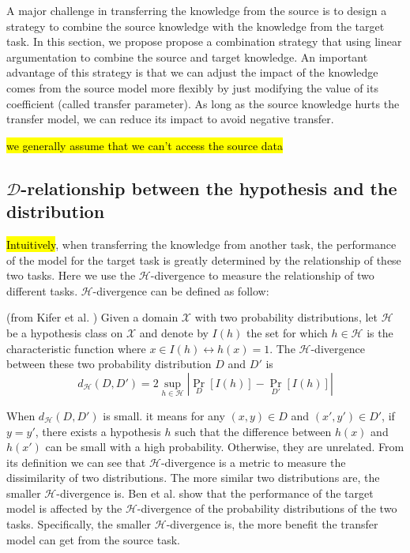 A major challenge in transferring the knowledge from the source is to design a strategy to combine the source knowledge with the knowledge from the target task. In this section, we propose propose a combination strategy that using linear argumentation to combine the source and target knowledge. An important advantage of this strategy is that we can adjust the impact of the knowledge comes from the source model more flexibly by just modifying the value of its coefficient (called transfer parameter). As long as the source knowledge hurts the transfer model, we can reduce its impact to avoid negative transfer.

\hl{we generally assume that we can't access the source data}

\subsection{$\mathcal{D}$-relationship between the hypothesis and the distribution}
\hl{Intuitively}, when transferring the knowledge from another task, the performance of the model for the target task is greatly determined by the relationship of these two tasks. Here we use the $\mathcal{H}$-divergence to measure the relationship of two different tasks. $\mathcal{H}$-divergence can be defined as follow:
\begin{defi} \label{single:hdivergence}
	(from Kifer et al. \cite{kifer2004detecting}) Given a domain $\mathcal{X}$ with two probability distributions, let $\mathcal{H}$ be a hypothesis class on $\mathcal{X}$ and denote by $I(h)$ the set for which $h \in \mathcal{H}$ is the characteristic function where $x\in I(h) \leftrightarrow h(x)=1$. The $\mathcal{H}$-divergence between these two probability distribution $D$ and $D'$ is 
	\begin{equation*}
	{d_{\mathcal{H}}}\left( {D,D'} \right) = 2\mathop {\sup }\limits_{h \in {\mathcal{H}}} \left| {{{\Pr }_D}\left[ {I(h)} \right] - {{\Pr }_{D'}}\left[ {I(h)} \right]} \right|
	\end{equation*}
\end{defi}
When $d_{\mathcal{H}}\left( {D,D'} \right)$ is small. it means for any $(x,y) \in D$ and $(x',y') \in D'$, if $y=y'$, there exists a hypothesis $h$ such that the difference between $h(x)$ and $h(x')$ can be small with a high probability. Otherwise, they are unrelated. From its definition we can see that $\mathcal{H}$-divergence is a metric to measure the dissimilarity of two distributions. The more similar two distributions are, the smaller $\mathcal{H}$-divergence is. Ben et al. \cite{ben2010theory} show that the performance of the target model is affected by the $\mathcal{H}$-divergence of the probability distributions of the two tasks. Specifically, the smaller $\mathcal{H}$-divergence is, the more benefit the transfer model can get from the source task.


